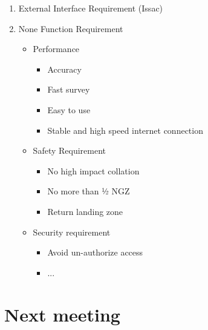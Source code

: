 \documentclass[11pt, a4paper]{article}
\begin{document}
\begin{enumerate}
		\item External Interface Requirement (Issac)
		\item None Function Requirement
		\begin{itemize}
			\item Performance
			\begin{itemize}
				\item Accuracy
				\item Fast survey
				\item Easy to use
				\item Stable and high speed internet connection
			\end{itemize}
			\item Safety Requirement 
			\begin{itemize}
				\item No high impact collation
				\item No more than ½ NGZ
				\item Return landing zone 
			\end{itemize}
			\item Security requirement
			\begin{itemize}
				\item Avoid un-authorize access
				\item ...
			\end{itemize}
		\end{itemize}
	\end{enumerate}
	
	
	
	\section{Next meeting}
	
	\vspace*{10pt}
	
\end{document}
